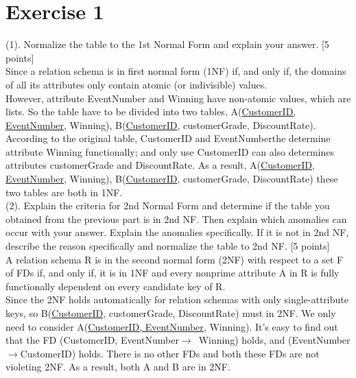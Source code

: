 \documentclass[]{article}
\title{}
\author{}
\date{}
\begin{document}
	
	
	
	\section{Exercise 1}
	
	(1). Normalize the table to the 1st Normal Form and explain your answer. [5 points] \\ 
	
	\noindent Since a relation schema is in first normal form (1NF) if, and only if, the domains of all its attributes only contain atomic (or indivisible) values.   \\
	
	\noindent However, attribute EventNumber and Winning have non-atomic values, which are lists. So the table have to be divided into two tables, A(\underline{CustomerID, EventNumber}, Winning), B(\underline{CustomerID}, customerGrade, DiscountRate). According to the original table, CustomerID and EventNumberthe determine attribute Winning functionally; and only use CustomerID can also determines attributes customerGrade and DiscountRate. As a result, A(\underline{CustomerID, EventNumber}, Winning), B(\underline{CustomerID}, customerGrade, DiscountRate) these two tables are both in 1NF.  \\
	
	\noindent (2). Explain the criteria for 2nd Normal Form and determine if the table you obtained from the previous part is in 2nd NF. Then explain which anomalies can occur with your answer. Explain the anomalies specifically. If it is not in 2nd NF, describe the reason specifically and normalize the table to 2nd NF. [5 points]  \\
	
	\noindent A relation schema R is in the second normal form (2NF) with respect to a set F of FDs if, and only if, it is in 1NF and every nonprime attribute A in R is fully functionally dependent on every candidate key of R.   \\
	
	\noindent Since the 2NF holds automatically for relation schemas with only single-attribute keys, so B(\underline{CustomerID}, customerGrade, DiscountRate) must in 2NF. We only need to consider A(\underline{CustomerID, EventNumber}, Winning). It's easy to find out that the FD (CustomerID, EventNumber$\rightarrow$\ Winning) holds, and (EventNumber$\rightarrow$CustomerID) holds. There is no other FDs and both these FDs are not violeting 2NF. As a result, both A and B are in 2NF.   \\
	
\end{document}
